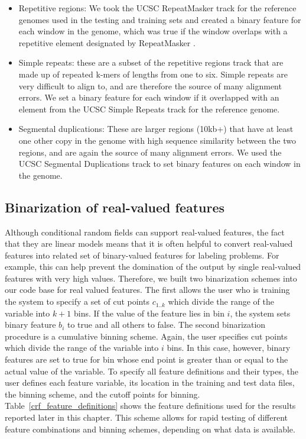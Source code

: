 \begin{itemize}
\item Repetitive regions: We took the UCSC RepeatMasker track for the reference genomes used in the testing and training sets and created a binary feature for each window in the genome, which was true if the window overlaps with a repetitive element designated by RepeatMasker \cite{repeatmasker}.

\item Simple repeats: these are a subset of the repetitive regions track that are made up of repeated k-mers of lengths from one to six. Simple repeats are very difficult to align to, and are therefore the source of many alignment errors. We set a binary feature for each window if it overlapped with an element from the UCSC Simple Repeats track \cite{Benson01011999} for the reference genome.

\item Segmental duplications: These are larger regions (10kb+) that have at least one other copy in the genome with high sequence similarity between the two regions, and are again the source of many alignment errors. We used the UCSC Segmental Duplications track to set binary features on each window in the genome.

\end{itemize}

\subsection{Binarization of real-valued features}

Although conditional random fields can support real-valued features, the fact that they are linear models means that it is often helpful to convert real-valued features into related set of binary-valued features for labeling problems. For example, this can help prevent the domination of the output by single real-valued features with very high values. Therefore, we built two binarization schemes into our code base for real valued features. The first allows the user who is training the system to specify a set of cut points $c_{1..k}$ which divide the range of the variable into $k + 1$ bins. If the value of the feature lies in bin $i$, the system sets binary feature $b_i$ to true and all others to false. The second binarization procedure is a cumulative binning scheme. Again, the user specifies cut points which divide the range of the variable into $i$ bins. In this case, however, binary features are set to true for bin whose end point is greater than or equal to the actual value of the variable. To specify all feature definitions and their types, the user defines each feature variable, its location in the training and test data files, the binning scheme, and the cutoff points for binning. Table~\ref{crf_feature_definitions} shows the feature definitions used for the results reported later in this chapter. This scheme allows for rapid testing of different feature combinations and binning schemes, depending on what data is available.

